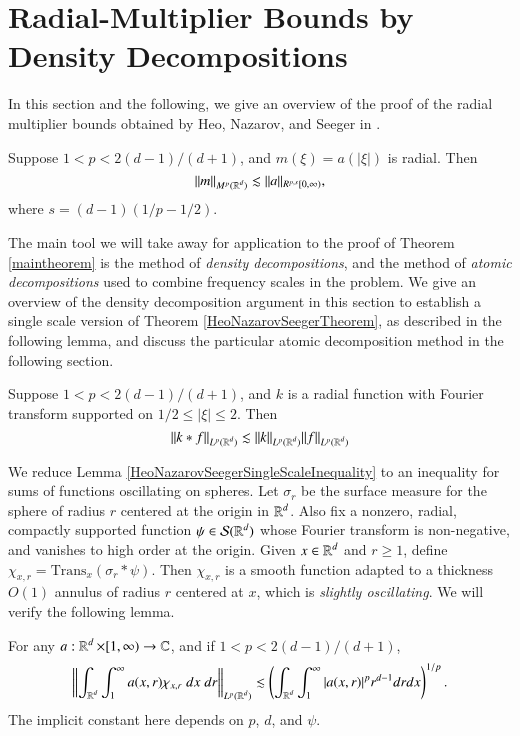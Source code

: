\section{Radial-Multiplier Bounds by Density Decompositions} \label{sec:densitydecompositions}

In this section and the following, we give an overview of the proof of the radial multiplier bounds obtained by Heo, Nazarov, and Seeger in \cite{HeoandNazarovandSeeger}.

\begin{theorem} \label{HeoNazarovSeegerTheorem}
    Suppose $1 < p < 2(d-1)/(d+1)$, and $m(\xi) = a(|\xi|)$ is radial. Then
    \[ \| m \|_{M^p(\operatorname{\mathbb{R}}^d)} \lesssim \| a \|_{R^{p,s}[0,\infty)}, \]
    where $s = (d-1)(1/p - 1/2)$.
\end{theorem}

The main tool we will take away for application to the proof of Theorem \ref{maintheorem} is the method of \emph{density decompositions}, and the method of \emph{atomic decompositions} used to combine frequency scales in the problem. We give an overview of the density decomposition argument in this section to establish a single scale version of Theorem \ref{HeoNazarovSeegerTheorem}, as described in the following lemma, and discuss the particular atomic decomposition method in the following section.

\begin{lemma} \label{HeoNazarovSeegerSingleScaleInequality}
  Suppose $1 < p < 2(d-1)/(d+1)$, and $k$ is a radial function with Fourier transform supported on $1/2 \leq |\xi| \leq 2$. Then
%
\[ \| k * f \|_{L^p(\operatorname{\mathbb{R}}^d)} \lesssim \| k \|_{L^p(\operatorname{\mathbb{R}}^d)} \| f \|_{L^p(\operatorname{\mathbb{R}}^d)} \]
%
\end{lemma}

We reduce Lemma \ref{HeoNazarovSeegerSingleScaleInequality} to an inequality for sums of functions oscillating on spheres. Let $\sigma_r$ be the surface measure for the sphere of radius $r$ centered at the origin in $\operatorname{\mathbb{R}}^d$. Also fix a nonzero, radial, compactly supported function $\psi \in \mathcal{S}(\operatorname{\mathbb{R}}^d)$ whose Fourier transform is non-negative, and vanishes to high order at the origin. Given $x \in \operatorname{\mathbb{R}}^d$ and $r \geq 1$, define $\chi_{x, r} = \text{Trans}_x (\sigma_r * \psi)$. Then $\chi_{x,r}$ is a smooth function adapted to a thickness $O(1)$ annulus of radius $r$ centered at $x$, which is \emph{slightly oscillating}. We will verify the following lemma.

\begin{lemma} \label{lemma1}
    For any $a : \operatorname{\mathbb{R}}^d \times [1,\infty) \to \operatorname{\mathbb{C}}$, and if $1 < p < 2(d-1)/(d+1)$,
    \[ \left\| \int_{\operatorname{\mathbb{R}}^d} \int_1^\infty a(x,r) \chi_{x, r}\; dx\; dr \right\|_{L^p(\operatorname{\mathbb{R}}^d)} \lesssim \left( \int_{\operatorname{\mathbb{R}}^d} \int_1^\infty |a(x,r)|^p r^{d-1} dr dx \right)^{1/p}. \]
    The implicit constant here depends on $p$, $d$, and $\psi$.
\end{lemma}

